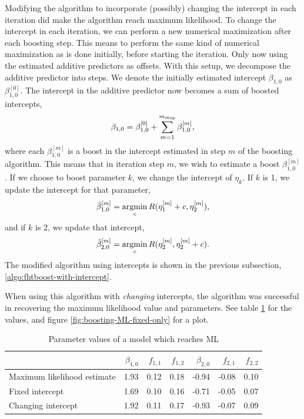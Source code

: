 Modifying the algorithm to incorporate (possibly) changing the intercept in each iteration did make the algorithm reach maximum likelihood.
To change the intercept in each iteration, we can perform a new numerical maximization after each boosting step.
This means to perform the same kind of numerical maximization as is done initially, before starting the iteration.
Only now using the estimated additive predictors as offsets.
With this setup, we decompose the additive predictor into steps.
We denote the initially estimated intercept $\beta_{1,0}$ as $\beta_{1,0}^{[0]}$.
The intercept in the additive predictor now becomes a sum of boosted intercepts,
\begin{equation}
    \beta_{1,0}=\beta_{1,0}^{[0]}+\sum_{m=1}^{m_{\text{stop}}}\beta_{1,0}^{[m]},
\end{equation}
where each $\beta_{1,0}^{[m]}$ is a boost in the intercept estimated in step $m$ of the boosting algorithm.
This means that in iteration step $m$, we wish to estimate a boost $\beta_{1,0}^{[m]}$.
If we choose to boost parameter $k$, we change the intercept of $\eta_k$.
If $k$ is 1, we update the intercept for that parameter,
\begin{equation}
    \hat{\beta}_{1,0}^{[m]}=\operatorname*{argmin}_{c}R(\eta_1^{[m]}+c,\eta_2^{[m]}),
\end{equation}
and if $k$ is 2, we update that intercept,
\begin{equation}
    \hat{\beta}_{2,0}^{[m]}=\operatorname*{argmin}_{c}R(\eta_2^{[m]},\eta_2^{[m]}+c).
\end{equation}
The modified algorithm using intercepts is shown in the previous subsection, \ref{algo:fhtboost-with-intercept}.

When using this algorithm with \textit{changing} intercepts, the algorithm was successful in recovering the maximum likelihood value and parameters.
See table \ref{table:ML} for the values, and figure \ref{fig:boosting-ML-fixed-only} for a plot.
\begin{table}\caption{Parameter values of a model which reaches ML}\label{table:ML}
\begin{tabular}{l|rrrrrr}
    & $\beta_{1,0}$ & $f_{1,1}$ & $f_{1,2}$ & $\beta_{2,0}$ & $f_{2,1}$ & $f_{2,2}$ \\
\hline
Maximum likelihood estimate     &    1.93 &    0.12 &    0.18 &    -0.94 &    -0.08 &     0.10 \\
Fixed intercept &    1.69 &    0.10 &    0.16 &    -0.71 &    -0.05 &     0.07 \\
Changing intercept    &    1.92 &    0.11 &    0.17 &    -0.93 &    -0.07 &     0.09
\end{tabular}\end{table}

